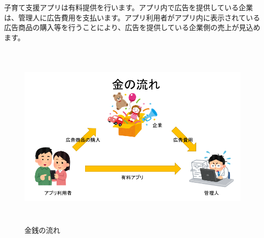 \documentclass[a4j]{jarticle}
\begin{document}
子育て支援アプリは有料提供を行います。アプリ内で広告を提供している企業は、管理人に広告費用を支払います。アプリ利用者がアプリ内に表示されている広告商品の購入等を行うことにより、広告を提供している企業側の売上が見込めます。

\begin{figure}[h]
  \begin{center}
    \includegraphics[width = 14cm, height = 9cm]{section5_money.png}
    \caption{金銭の流れ}
    \label{money}
  \end{center}
\end{figure}
\end{document}
